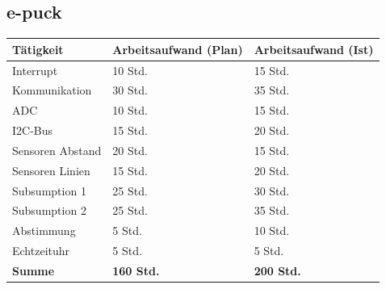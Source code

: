 \documentclass[10pt,a4paper]{article}
\begin{document}
		\subsection{e-puck}
		\begin{tabular}{|l|l|l|}
			\hline \textbf{Tätigkeit} & \textbf{Arbeitsaufwand} (Plan) & \textbf{Arbeitsaufwand} (Ist) \\ 
			\hline Interrupt & 10 Std. & 15 Std. \\ 
			\hline Kommunikation & 30 Std. & 35 Std. \\ 
			\hline ADC & 10 Std. & 15 Std. \\ 
			\hline I2C-Bus & 15 Std. & 20 Std. \\ 
			\hline Sensoren Abstand & 20 Std. & 15 Std. \\ 
			\hline Sensoren Linien & 15 Std. & 20 Std. \\ 
			\hline Subsumption 1 & 25 Std. & 30 Std. \\ 
			\hline Subsumption 2 & 25 Std. & 35 Std. \\ 
			\hline Abstimmung & 5 Std. & 10 Std. \\ 
			\hline Echtzeituhr & 5 Std. & 5 Std. \\ 
			\hline \textbf{Summe} & \textbf{160 Std.} & \textbf{200 Std.} \\ 
			\hline 
		\end{tabular} 
				 			
\end{document}
